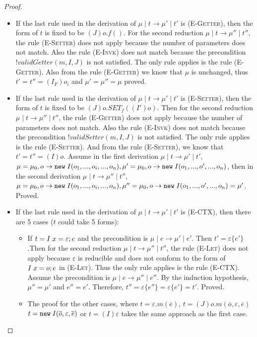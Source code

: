 \begin{proof}
\begin{itemize}
	\item If the last rule used in the derivation of $\mu \mid t \to \mu' \mid t'$ is \textsc{(E-Getter)}, then the form of $t$ is fixed to be $(J)o.f()$. For the second reduction $\mu \mid t \to \mu'' \mid t''$, the rule \textsc{(E-Setter)} does not apply because the number of parameters does not match. Also the rule \textsc{(E-Invk)} does not match because the precondition $!validGetter(m, I, J)$ is not satisfied. The only rule applies  is the rule \textsc{(E-Getter)}. Also from the rule \textsc{(E-Getter)} we know that $\mu$ is unchanged, thus $t' = t'' = (I_F)o_i$ and $\mu' = \mu'' = \mu$ proved.
	
	\item If the last rule used in the derivation of $\mu \mid t \to \mu' \mid t'$ is \textsc{(E-Setter)}, then the form of $t$ is fixed to be $(J)o.SET_f((I')o)$. Then for the second reduction $\mu \mid t \to \mu'' \mid t''$, the rule \textsc{(E-Getter)} does not apply because the number of parameters does not match. Also the rule \textsc{(E-Invk)} does not match because the precondition $!validSetter(m, I, J)$ is not satisfied. The only rule applies is the rule \textsc{(E-Setter)}. And from the rule \textsc{(E-Setter)}, we know that $t' = t'' = (I)o$. Assume in the first derivation $\mu \mid t \to \mu' \mid t'$, $\mu = \mu_0, o \to \texttt{new} \; I(o_1,...,o_i,...,o_n), \mu' = \mu_0, o \to \texttt{new} \; I(o_1,...,o',...,o_n)$, then in the second derivation $\mu \mid t \to \mu'' \mid t''$, $\mu = \mu_0, o \to \texttt{new} \; I(o_1,...,o_i,...,o_n), \mu'' = \mu_0, o \to \texttt{new} \; I(o_1,...,o',...,o_n) = \mu'$. Proved.

    \item If the last rule used in the derivation of $\mu \mid t \to \mu' \mid t'$ is \textsc{(E-CTX)}, then there are 5 cases ($t$ could take 5 forms):
    \begin{itemize}
    	\item If $t = I \; x = \varepsilon;e$ and the precondition is $\mu \mid e \to \mu' \mid e'$. Then $t' = \varepsilon\{e'\}$ .Then for the second reduction $\mu \mid t \to \mu'' \mid t''$, the rule \textsc{(E-Let)} does not apply because $\varepsilon$ is reducible and does not conform to the form of $I \; x = o;e$ in \textsc{(E-Let)}. Thus the only rule applies is the rule \textsc{(E-CTX)}. Assume the precondition is $\mu \mid e \to \mu'' \mid e''$. By the induction hypothesis, $\mu'' = \mu'$ and $e'' = e'$. Therefore, $t'' = \varepsilon\{e''\} = \varepsilon\{e'\} = t'$. Proved.
    	\item The proof for the other cases, where 
    		$t = \varepsilon.m(\overline{e}) $, 
            $t = (J)o.m(\overline{o}, \varepsilon, \overline{e}) $
            $t = \texttt{new} \; I(\overline{o}, \varepsilon, \overline{e}) $
            or $t = (I)\varepsilon $ takes the same approach as the first case.
    \end{itemize}
\end{itemize}
\end{proof}
